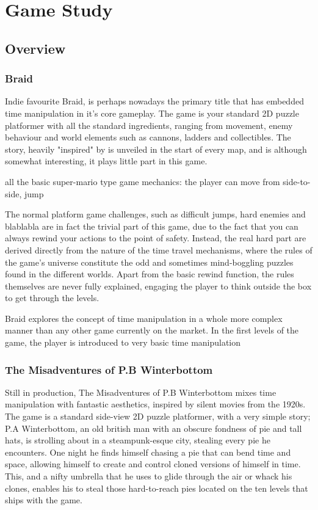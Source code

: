 
\chapter{Game Study}

\section{Overview}

\subsection{Braid}
Indie favourite Braid, is perhaps nowadays the primary title that has embedded time manipulation in it's core gameplay. The game is your standard 2D puzzle platformer with all the standard ingredients, ranging from movement, enemy behaviour and world elements such as cannons, ladders and collectibles. The story, heavily "inspired" by is unveiled in the start of every map, and is although somewhat interesting, it plays little part in this game. 

all the basic super-mario type game mechanics: the player can move from side-to-side, jump 

The normal platform game challenges, such as difficult jumps, hard enemies and blablabla are in fact the trivial part of this game, due to the fact that you can always rewind your actions to the point of safety. Instead, the real hard part are derived directly from the nature of the time travel mechanisms, where the rules of the game's universe constitute the odd and sometimes mind-boggling puzzles found in the different worlds. Apart from the basic rewind function, the rules themselves are never fully explained, engaging the player to think outside the box to get through the levels. 

Braid explores the concept of time manipulation in a whole more complex manner than any other game currently on the market. In the first levels of the game, the player is introduced to very basic time manipulation 

\subsection{The Misadventures of P.B Winterbottom}

Still in production, The Misadventures of P.B Winterbottom mixes time manipulation with fantastic aesthetics, inspired by silent movies from the 1920s. 
The game is a standard side-view 2D puzzle platformer, with a very simple story; P.A Winterbottom, an old british man with an obscure fondness of pie and tall hats,
 is strolling about in a steampunk-esque city, stealing every pie he encounters. One night he finds himself chasing a pie that can bend time and space,
 allowing himself to create and control cloned versions of himself in time. This, and a nifty umbrella that he uses to glide through the air or whack his clones, 
enables his to steal those hard-to-reach pies located on the ten levels that ships with the game.


